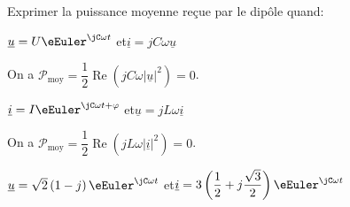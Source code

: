 \smallskip

Exprimer la puissance moyenne reçue par le dipôle quand:





\begin{enonce}
$\underline{u}=U\eEuler^{\jC \omega t}$ \quad et\quad $\underline{i}=jC\omega\underline{u}$
\end{enonce}


\begin{corrige}
On a $\mathcal{P}_{\text{moy}}=\dfrac{1}{2}\operatorname{Re}\left(jC\omega\left|\underline{u}\right|^{2}\right)=0$.
\end{corrige}





\begin{enonce}
$\underline{i}=I\eEuler^{\jC \omega t+\varphi}$  \quad et\quad $\underline{u}=jL\omega\underline{i}$
\end{enonce}


\begin{corrige}
On a $\mathcal{P}_{\text{moy}}=\dfrac{1}{2}\operatorname{Re}\left(jL\omega\left|\underline{i}\right|^{2}\right)=0$.
\end{corrige}





\begin{enonce}
$\underline{u}=\sqrt{2}\left(1-j\right)\eEuler^{\jC \omega t}$  \quad et\quad $\underline{i}=3\left(\dfrac{1}{2}+j\dfrac{\sqrt{3}}{2}\right)\eEuler^{\jC \omega t}$
\end{enonce}



